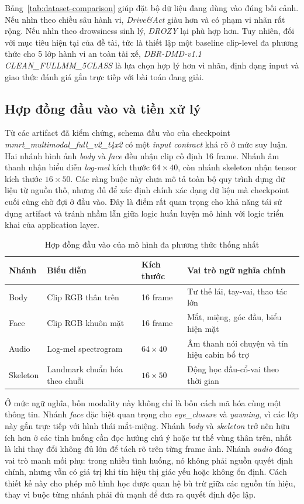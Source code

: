 \documentclass[conference,a4paper]{IEEEtran}
\begin{document}
Bảng~\ref{tab:dataset-comparison} giúp đặt bộ dữ liệu đang dùng vào đúng bối cảnh. Nếu nhìn theo chiều sâu hành vi, \textit{Drive\&Act} giàu hơn và có phạm vi nhãn rất rộng. Nếu nhìn theo drowsiness sinh lý, \textit{DROZY} lại phù hợp hơn. Tuy nhiên, đối với mục tiêu hiện tại của đề tài, tức là thiết lập một baseline clip-level đa phương thức cho 5 lớp hành vi an toàn tài xế, \textit{DBR-DMD-v1.1 CLEAN\_FULLMM\_5CLASS} là lựa chọn hợp lý hơn vì nhãn, định dạng input và giao thức đánh giá gắn trực tiếp với bài toán đang giải.

\subsection{Hợp đồng đầu vào và tiền xử lý}
Từ các artifact đã kiểm chứng, schema đầu vào của checkpoint \textit{mmrt\_multimodal\_full\_v2\_t4x2} có một \textit{input contract} khá rõ ở mức suy luận. Hai nhánh hình ảnh \textit{body} và \textit{face} đều nhận clip cố định 16 frame. Nhánh âm thanh nhận biểu diễn \textit{log-mel} kích thước $64 \times 40$, còn nhánh skeleton nhận tensor kích thước $16 \times 50$. Các ràng buộc này chưa mô tả toàn bộ quy trình dựng dữ liệu từ nguồn thô, nhưng đủ để xác định chính xác dạng dữ liệu mà checkpoint cuối cùng chờ đợi ở đầu vào. Đây là điểm rất quan trọng cho khả năng tái sử dụng artifact và tránh nhầm lẫn giữa logic huấn luyện mô hình với logic triển khai của application layer.

\begin{table}[t]
\caption{Hợp đồng đầu vào của mô hình đa phương thức thống nhất}
\label{tab:input-contract}
\centering
\small
\begin{tabular}{L{1.0cm}L{1.35cm}L{1.25cm}L{2.25cm}}
\toprule
Nhánh & Biểu diễn & Kích thước & Vai trò ngữ nghĩa chính \\
\midrule
Body & Clip RGB thân trên & 16 frame & Tư thế lái, tay-vai, thao tác lớn \\
Face & Clip RGB khuôn mặt & 16 frame & Mắt, miệng, góc đầu, biểu hiện mặt \\
Audio & Log-mel spectrogram & $64 \times 40$ & Âm thanh nói chuyện và tín hiệu cabin bổ trợ \\
Skeleton & Landmark chuẩn hóa theo chuỗi & $16 \times 50$ & Động học đầu-cổ-vai theo thời gian \\
\bottomrule
\end{tabular}
\end{table}

Ở mức ngữ nghĩa, bốn modality này không chỉ là bốn cách mã hóa cùng một thông tin. Nhánh \textit{face} đặc biệt quan trọng cho \textit{eye\_closure} và \textit{yawning}, vì các lớp này gắn trực tiếp với hình thái mắt-miệng. Nhánh \textit{body} và \textit{skeleton} trở nên hữu ích hơn ở các tình huống cần đọc hướng chú ý hoặc tư thế vùng thân trên, nhất là khi thay đổi không đủ lớn để tách rõ trên từng frame ảnh. Nhánh \textit{audio} đóng vai trò manh mối phụ: trong nhiều tình huống, nó không phải nguồn quyết định chính, nhưng vẫn có giá trị khi tín hiệu thị giác yếu hoặc không ổn định. Cách thiết kế này cho phép mô hình học được quan hệ bù trừ giữa các nguồn tín hiệu, thay vì buộc từng nhánh phải đủ mạnh để đưa ra quyết định độc lập.
\end{document}
